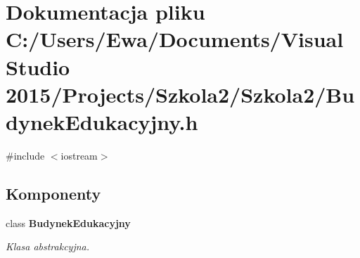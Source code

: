 \section{Dokumentacja pliku C\+:/\+Users/\+Ewa/\+Documents/\+Visual Studio 2015/\+Projects/\+Szkola2/\+Szkola2/\+Budynek\+Edukacyjny.h}
\label{_budynek_edukacyjny_8h}
{\ttfamily \#include $<$iostream$>$}\newline
\subsection*{Komponenty}
\begin{DoxyCompactItemize}
\item 
class \textbf{ Budynek\+Edukacyjny}
\begin{DoxyCompactList}\small\item\em Klasa abstrakcyjna. \end{DoxyCompactList}\end{DoxyCompactItemize}
